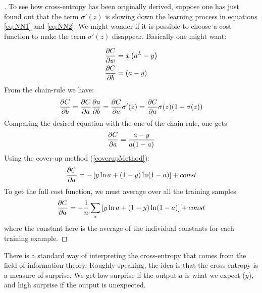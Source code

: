 \begin{proof}[]
To see how cross-entropy has been originally derived, suppose one has just found out that the term $\sigma'(z)$ is slowing down the learning process in equations \autoref{eq:NN1} and \autoref{eq:NN2}. We might wonder if it is possible to choose a cost function to make the term  $\sigma'(z)$ disappear. Basically one might want:

\begin{equation}
\begin{aligned}
\frac{\partial C}{\partial w} & =x \left( a^L - y\right)\\
\frac{\mathrm{\partial} C}{\mathrm{\partial} b} &=\left( a - y\right)
\end{aligned}
\end{equation}
From the chain-rule we have:
\begin{equation}
\frac{\mathrm{\partial} C}{\mathrm{\partial} b} =\frac{\mathrm{\partial} C}{\mathrm{\partial} a} \frac{\mathrm{\partial} a}{\mathrm{\partial} b }  =\frac{\mathrm{\partial} C}{\mathrm{\partial} a}\sigma'(z) = \frac{\mathrm{\partial} C}{\mathrm{\partial} a} \sigma(z)(1-\sigma(z))
\end{equation}
Comparing the desired equation with the one of the chain rule, one gets
\begin{equation}
\frac{\mathrm{\partial} C}{\mathrm{\partial} a} = \frac{a-y}{a(1-a)} 
\end{equation}
Using the cover-up method (\autoref{coverupMethod}):
\begin{equation}
\frac{\mathrm{\partial} C}{\mathrm{\partial} a} = -\left[ y\ln a + (1-y)\ln(1-a)\right]+const
\end{equation}
To get the full cost function, we must average over all the training samples
\begin{equation}
\frac{\mathrm{\partial} C}{\mathrm{\partial} a} = -\frac{1}{n}\sum_x\left[y\ln a + (1-y)\ln(1-a)\right]+const
\end{equation}
where the constant here is the average of the individual constants for each training example.
\end{proof}

There is a standard way of interpreting the cross-entropy that comes from the field of information theory. Roughly speaking, the idea is that the cross-entropy is a measure of surprise. We get low surprise if the output $a$ is what we expect ($y$), and high surprise if the output is unexpected.


